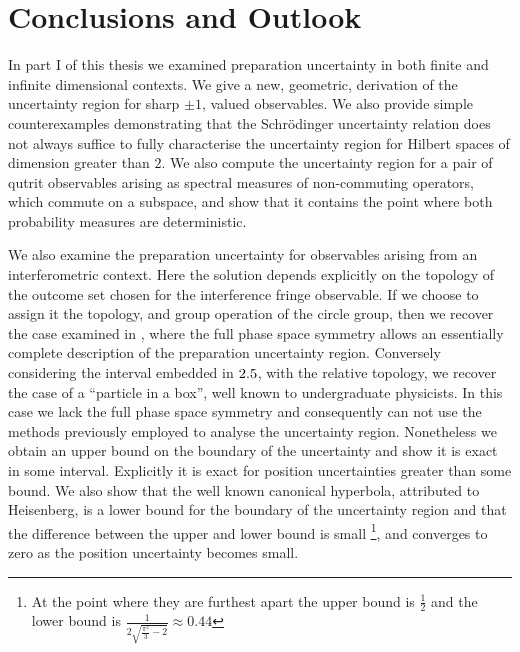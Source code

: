 \let\textcircled=\pgftextcircled
\chapter{Conclusions and Outlook} \label{chap:conclusion}


In part I of this thesis we examined preparation uncertainty in both finite and infinite dimensional contexts. We give a new, geometric, derivation of the uncertainty region for sharp $\pm 1$, valued observables. We also provide simple counterexamples demonstrating that the Schr{\"o}dinger uncertainty relation does not always suffice to fully characterise the uncertainty region for Hilbert spaces of dimension greater than $2$. We also compute the uncertainty region for a pair of qutrit observables arising as spectral measures of non-commuting operators, which commute on a subspace, and show that it contains the point where both probability measures are deterministic.

We also examine the preparation uncertainty for observables arising from an interferometric context. Here the solution depends explicitly on the topology of the outcome set chosen for the interference fringe observable. If we choose to assign it the topology, and group operation of the circle group, then we recover the case examined in \cite{sharp-ur-num-angle}, where the full phase space symmetry allows an essentially complete description of the preparation uncertainty region. Conversely considering the interval embedded in $2.5$, with the relative topology, we recover the case of a ``particle in a box'', well known to undergraduate physicists. In this case we lack the full phase space symmetry and consequently can not use the methods previously employed to analyse the uncertainty region. Nonetheless we obtain an upper bound on the boundary of the uncertainty and show it is exact in some interval. Explicitly it is exact for position uncertainties greater than some bound. We also show that the well known canonical hyperbola, attributed to Heisenberg, is a lower bound for the boundary of the uncertainty region and that the difference between the upper and lower bound is small \footnote{At the point where they are furthest apart the upper bound is $\frac{1}{2}$ and the lower bound is $\frac{1}{2\sqrt{\frac{\pi^2}{3} -2}}\approx 0.44$}, and converges to zero as the position uncertainty becomes small. 


